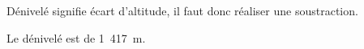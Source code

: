 \exo{}

Dénivelé signifie écart d'altitude, il faut donc réaliser une soustraction.

\medskip
{} \hspace{
3cm} Le dénivelé est de 1~417~m.